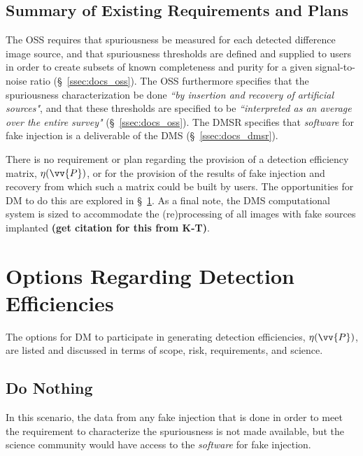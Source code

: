 \documentclass[DM,lsstdraft,toc]{lsstdoc}
\begin{document}
\subsection{Summary of Existing Requirements and Plans}\label{ssec:docs_sum}

The OSS requires that spuriousness be measured for each detected difference image source, and that spuriousness thresholds are defined and supplied to users in order to create subsets of known completeness and purity for a given signal-to-noise ratio (\S~\ref{ssec:docs_oss}). The OSS furthermore specifies that the spuriousness characterization be done {\it ``by insertion and recovery of artificial sources"}, and that these thresholds are specified to be {\it ``interpreted as an average over the entire survey"} (\S~\ref{ssec:docs_oss}). The DMSR specifies that {\it software} for fake injection is a deliverable of the DMS (\S~\ref{ssec:docs_dmsr}).

There is no requirement or plan regarding the provision of a detection efficiency matrix, $\eta(\vv{P})$, or for the provision of the results of fake injection and recovery from which such a matrix could be built by users. The opportunities for DM to do this are explored in \S~\ref{sec:opts}. As a final note, the DMS computational system is sized to accommodate the (re)processing of all images with fake sources implanted {\bf (get citation for this from K-T)}.




\section{Options Regarding Detection Efficiencies} \label{sec:opts}

The options for DM to participate in generating detection efficiencies, $\eta(\vv{P})$, are listed and discussed in terms of scope, risk, requirements, and science. 

\subsection{Do Nothing}\label{ssec:opts_no}

In this scenario, the data from any fake injection that is done in order to meet the requirement to characterize the spuriousness is not made available, but the science community would have access to the {\it software} for fake injection.
\end{document}
